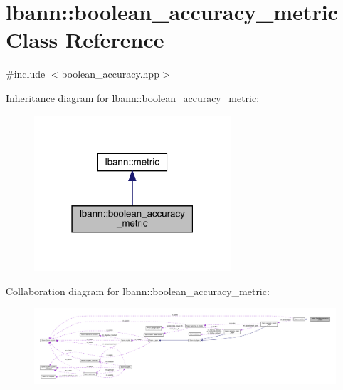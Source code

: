 \hypertarget{classlbann_1_1boolean__accuracy__metric}{}\section{lbann\+:\+:boolean\+\_\+accuracy\+\_\+metric Class Reference}
\label{classlbann_1_1boolean__accuracy__metric}


{\ttfamily \#include $<$boolean\+\_\+accuracy.\+hpp$>$}



Inheritance diagram for lbann\+:\+:boolean\+\_\+accuracy\+\_\+metric\+:\nopagebreak
\begin{figure}[H]
\begin{center}
\leavevmode
\includegraphics[width=207pt]{classlbann_1_1boolean__accuracy__metric__inherit__graph}
\end{center}
\end{figure}


Collaboration diagram for lbann\+:\+:boolean\+\_\+accuracy\+\_\+metric\+:\nopagebreak
\begin{figure}[H]
\begin{center}
\leavevmode
\includegraphics[width=350pt]{classlbann_1_1boolean__accuracy__metric__coll__graph}
\end{center}
\end{figure}
